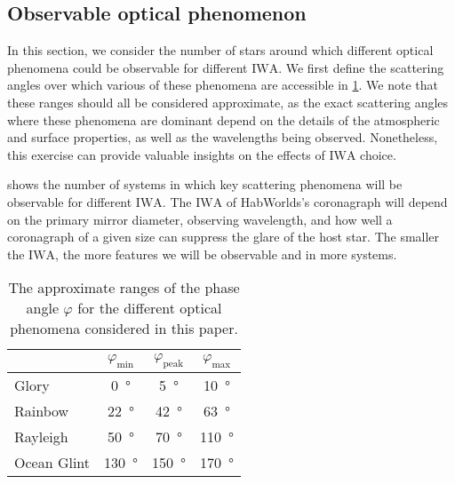 \documentclass[usenatbib]{mnras}
\newcommand{\IWA}{\ensuremath{\mathrm{IWA}}\xspace}
\newcommand{\HWO}{HabWorlds\xspace}
\begin{document}
\subsection{Observable optical phenomenon}
\label{sec:results_scattering_phenomena}

In this section, we consider the number of stars around which different optical phenomena could be observable for different \IWA.
We first define the scattering angles over which various of these phenomena are accessible in \cref{tab:phase_ranges}.
We note that these ranges should all be considered approximate, as the exact scattering angles where these phenomena are dominant depend on the details of the atmospheric and surface properties, as well as the wavelengths being observed.
Nonetheless, this exercise can provide valuable insights on the effects of \IWA choice. 

 shows the number of systems in which key scattering phenomena will be observable for different \IWA.
The \IWA of \HWO's coronagraph will depend on the primary mirror diameter, observing wavelength, and how well a coronagraph of a given size can suppress the glare of the host star.
The smaller the \IWA, the more features we will be observable and in more systems. 


\begin{table}
    \centering
    \caption{
        The approximate ranges of the phase angle $\varphi$ for the different optical phenomena considered in this paper.
    }
    \label{tab:phase_ranges}
    \begin{tabular}{ l c c c } 
        \toprule
        & $\varphi_\mathrm{min}$ & $\varphi_\mathrm{peak}$ & $\varphi_\mathrm{max}$ \\
        \midrule
        \midrule
        Glory       & \qty{0}{\degree}     & \qty{5}{\degree}     & \qty{10}{\degree} \\
        Rainbow    & \qty{22}{\degree}    & \qty{42}{\degree}    & \qty{63}{\degree} \\
        Rayleigh    & \qty{50}{\degree}    & \qty{70}{\degree}    & \qty{110}{\degree} \\
        Ocean Glint & \qty{130}{\degree}   & \qty{150}{\degree}   & \qty{170}{\degree} \\
        \bottomrule
    \end{tabular}
\end{table}
\end{document}
